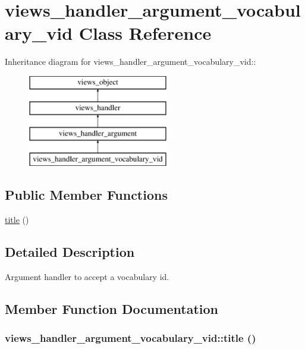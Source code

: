 \hypertarget{classviews__handler__argument__vocabulary__vid}{
\section{views\_\-handler\_\-argument\_\-vocabulary\_\-vid Class Reference}
\label{classviews__handler__argument__vocabulary__vid}
}
Inheritance diagram for views\_\-handler\_\-argument\_\-vocabulary\_\-vid::\begin{figure}[H]
\begin{center}
\leavevmode
\includegraphics[height=4cm]{classviews__handler__argument__vocabulary__vid}
\end{center}
\end{figure}
\subsection*{Public Member Functions}
\begin{CompactItemize}
\item 
\hyperlink{classviews__handler__argument__vocabulary__vid_f932cd38cbab2252261bcb077f2d9bd7}{title} ()
\end{CompactItemize}


\subsection{Detailed Description}
Argument handler to accept a vocabulary id. 

\subsection{Member Function Documentation}
\hypertarget{classviews__handler__argument__vocabulary__vid_f932cd38cbab2252261bcb077f2d9bd7}{
\subsubsection[{title}]{\setlength{\rightskip}{0pt plus 5cm}views\_\-handler\_\-argument\_\-vocabulary\_\-vid::title ()}}
\label{classviews__handler__argument__vocabulary__vid_f932cd38cbab2252261bcb077f2d9bd7}


